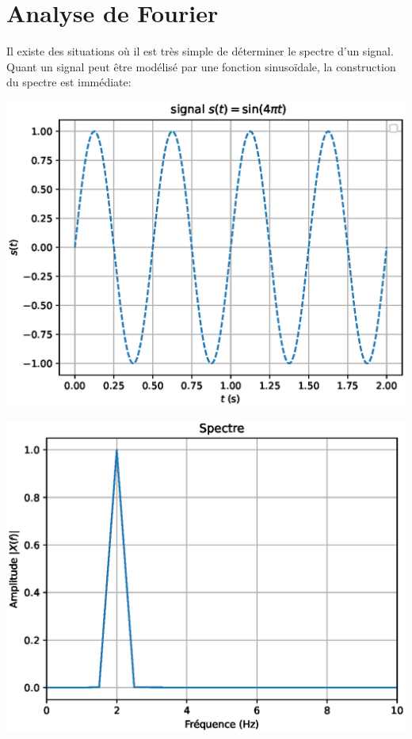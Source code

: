 \documentclass[11pt,a4paper]{article}
\begin{document}
\section{Analyse de Fourier}
Il existe des situations où il est très simple de déterminer le spectre d'un signal. Quant un signal peut être modélisé par une fonction sinusoïdale, la construction du spectre est immédiate:\\
\begin{minipage}{0.5\linewidth}
\includegraphics[scale=0.5]{sinus_4pi.eps} 

\end{minipage}\hfill
\begin{minipage}{0.5\linewidth}
\includegraphics[scale=0.5]{sinus_4pi_spectre.eps} 

\end{minipage}
\end{document}
